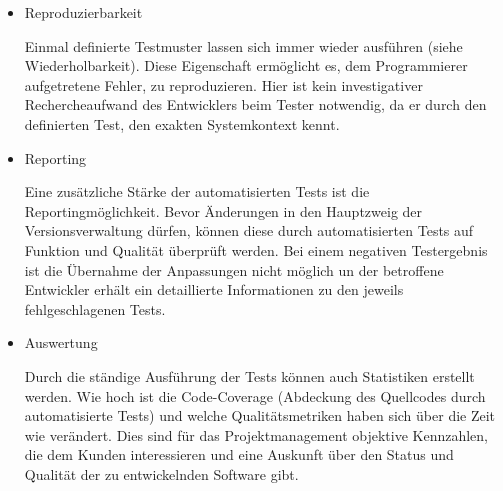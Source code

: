 \begin{itemize}
	\item Reproduzierbarkeit
	
	Einmal definierte Testmuster lassen sich immer wieder ausführen (siehe Wiederholbarkeit). Diese Eigenschaft ermöglicht es, dem Programmierer aufgetretene Fehler, zu reproduzieren. Hier ist kein investigativer Rechercheaufwand des Entwicklers beim Tester notwendig, da er durch den definierten Test, den exakten Systemkontext kennt.
	
	\item Reporting
	
	Eine zusätzliche Stärke der automatisierten Tests ist die Reportingmöglichkeit. Bevor Änderungen in den Hauptzweig der Versionsverwaltung dürfen, können diese durch automatisierten Tests auf Funktion und Qualität überprüft werden. Bei einem negativen Testergebnis ist die Übernahme der Anpassungen nicht möglich un der betroffene Entwickler erhält ein detaillierte Informationen zu den jeweils fehlgeschlagenen Tests.
	
	\item Auswertung
	
	Durch die ständige Ausführung der Tests können auch Statistiken erstellt werden. Wie hoch ist die Code-Coverage (Abdeckung des Quellcodes durch automatisierte Tests) und welche Qualitätsmetriken haben sich über die Zeit wie verändert. Dies sind für das Projektmanagement objektive Kennzahlen, die dem Kunden interessieren und eine Auskunft über den Status und Qualität der zu entwickelnden Software gibt.

\end{itemize}

